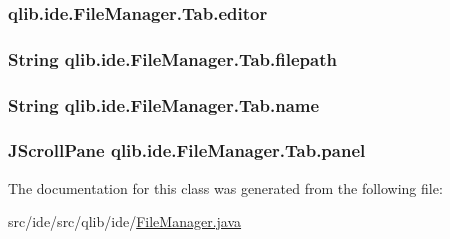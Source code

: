 \subsubsection[{\texorpdfstring{editor}{editor}}]{ qlib.\+ide.\+File\+Manager.\+Tab.\+editor\hspace{0.3cm}{\ttfamily [package]}}\hypertarget{classqlib_1_1ide_1_1FileManager_1_1Tab_a31feec1d770cf8dad4b3544539664da9}{}\label{classqlib_1_1ide_1_1FileManager_1_1Tab_a31feec1d770cf8dad4b3544539664da9}
\subsubsection[{\texorpdfstring{filepath}{filepath}}]{\setlength{\rightskip}{0pt plus 5cm}String qlib.\+ide.\+File\+Manager.\+Tab.\+filepath\hspace{0.3cm}{\ttfamily [package]}}\hypertarget{classqlib_1_1ide_1_1FileManager_1_1Tab_a0765cadcc1dc2dcecdc902bb72c0f573}{}\label{classqlib_1_1ide_1_1FileManager_1_1Tab_a0765cadcc1dc2dcecdc902bb72c0f573}
\subsubsection[{\texorpdfstring{name}{name}}]{\setlength{\rightskip}{0pt plus 5cm}String qlib.\+ide.\+File\+Manager.\+Tab.\+name\hspace{0.3cm}{\ttfamily [package]}}\hypertarget{classqlib_1_1ide_1_1FileManager_1_1Tab_ad12255d140c8ad871496cfa64157c987}{}\label{classqlib_1_1ide_1_1FileManager_1_1Tab_ad12255d140c8ad871496cfa64157c987}
\subsubsection[{\texorpdfstring{panel}{panel}}]{\setlength{\rightskip}{0pt plus 5cm}J\+Scroll\+Pane qlib.\+ide.\+File\+Manager.\+Tab.\+panel\hspace{0.3cm}{\ttfamily [package]}}\hypertarget{classqlib_1_1ide_1_1FileManager_1_1Tab_ad8b41415e7daa1153c2f0a16278362a4}{}\label{classqlib_1_1ide_1_1FileManager_1_1Tab_ad8b41415e7daa1153c2f0a16278362a4}


The documentation for this class was generated from the following file\+:\begin{DoxyCompactItemize}
\item 
src/ide/src/qlib/ide/\hyperlink{FileManager_8java}{File\+Manager.\+java}\end{DoxyCompactItemize}
